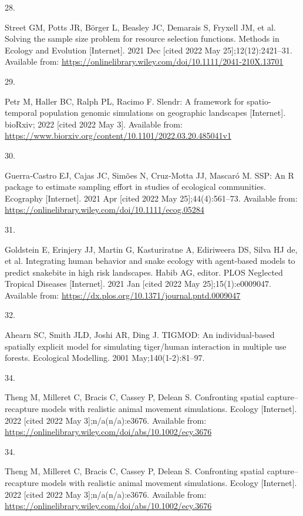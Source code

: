 \documentclass[10pt,a4paper]{article}
\newlength{\cslhangindent}
\newlength{\csllabelwidth}
\newlength{\cslentryspacingunit} %
\newenvironment{CSLReferences}[2] %
 {%
  \setlength{\parindent}{0pt}
  \ifodd #1
  \let\oldpar\par
  \def\par{\hangindent=\cslhangindent\oldpar}
  \fi
  \setlength{\parskip}{#2\cslentryspacingunit}
 }%
 {}
\newcommand{\CSLLeftMargin}[1]{\parbox[t]{\csllabelwidth}{#1}}
\newcommand{\CSLRightInline}[1]{\parbox[t]{\linewidth - \csllabelwidth}{#1}\break}
\begin{document}
\begin{CSLReferences}{0}{0}
\leavevmode\hypertarget{ref-street_solving_2021}{}%
\CSLLeftMargin{28. }
\CSLRightInline{Street GM, Potts JR, Börger L, Beasley JC, Demarais S, Fryxell JM, et al. Solving the sample size problem for resource selection functions. Methods in Ecology and Evolution {[}Internet{]}. 2021 Dec {[}cited 2022 May 25{]};12(12):2421--31. Available from: \url{https://onlinelibrary.wiley.com/doi/10.1111/2041-210X.13701}}

\leavevmode\hypertarget{ref-petr_slendr_2022}{}%
\CSLLeftMargin{29. }
\CSLRightInline{Petr M, Haller BC, Ralph PL, Racimo F. Slendr: A framework for spatio-temporal population genomic simulations on geographic landscapes {[}Internet{]}. bioRxiv; 2022 {[}cited 2022 May 3{]}. Available from: \url{https://www.biorxiv.org/content/10.1101/2022.03.20.485041v1}}

\leavevmode\hypertarget{ref-guerracastro_ssp_2021}{}%
\CSLLeftMargin{30. }
\CSLRightInline{Guerra‐Castro EJ, Cajas JC, Simões N, Cruz‐Motta JJ, Mascaró M. {SSP}: An {R} package to estimate sampling effort in studies of ecological communities. Ecography {[}Internet{]}. 2021 Apr {[}cited 2022 May 25{]};44(4):561--73. Available from: \url{https://onlinelibrary.wiley.com/doi/10.1111/ecog.05284}}

\leavevmode\hypertarget{ref-goldstein_integrating_2021}{}%
\CSLLeftMargin{31. }
\CSLRightInline{Goldstein E, Erinjery JJ, Martin G, Kasturiratne A, Ediriweera DS, Silva HJ de, et al. Integrating human behavior and snake ecology with agent-based models to predict snakebite in high risk landscapes. Habib AG, editor. PLOS Neglected Tropical Diseases {[}Internet{]}. 2021 Jan {[}cited 2022 May 25{]};15(1):e0009047. Available from: \url{https://dx.plos.org/10.1371/journal.pntd.0009047}}

\leavevmode\hypertarget{ref-Ahearn2001}{}%
\CSLLeftMargin{32. }
\CSLRightInline{Ahearn SC, Smith JLD, Joshi AR, Ding J. {TIGMOD}: {An} individual-based spatially explicit model for simulating tiger/human interaction in multiple use forests. Ecological Modelling. 2001 May;140(1-2):81--97. }

\leavevmode\hypertarget{ref-theng_confronting_2022}{}%
\CSLLeftMargin{34. }
\CSLRightInline{Theng M, Milleret C, Bracis C, Cassey P, Delean S. Confronting spatial capture--recapture models with realistic animal movement simulations. Ecology {[}Internet{]}. 2022 {[}cited 2022 May 3{]};n/a(n/a):e3676. Available from: \url{https://onlinelibrary.wiley.com/doi/abs/10.1002/ecy.3676}}

\leavevmode\hypertarget{ref-theng_confronting_2022}{}%
\CSLLeftMargin{34. }
\CSLRightInline{Theng M, Milleret C, Bracis C, Cassey P, Delean S. Confronting spatial capture--recapture models with realistic animal movement simulations. Ecology {[}Internet{]}. 2022 {[}cited 2022 May 3{]};n/a(n/a):e3676. Available from: \url{https://onlinelibrary.wiley.com/doi/abs/10.1002/ecy.3676}}


\end{CSLReferences}
\end{document}
